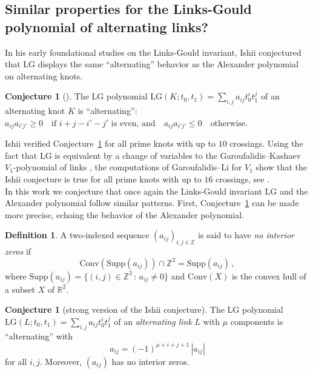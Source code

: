 \documentclass[12pt,reqno]{amsart}
\theoremstyle{definition}
\newtheorem{definition}[theorem]{Definition}
\newtheorem{conjecture}[theorem]{Conjecture}
\def\LG{\mathrm{LG}}
\begin{document}
\subsection{Similar properties for the Links-Gould polynomial of alternating links?} In his early foundational studies on the Links-Gould invariant, Ishii conjectured that $\LG$ displays the same ``alternating'' behavior as the Alexander polynomial on alternating knots.

\begin{conjecture}[\cite{Ishii}]\label{conj.0}
    The LG polynomial $\LG(K ; t_0, t_1) = \sum_{i,j} a_{ij} t_0^i t_1^j$ of an alternating knot $K$ is ``alternating'': 
$a_{ij} a_{i'j'} \geq 0 \quad \text{if } i + j - i' - j' \text{ is even, and} \quad
a_{ij} a_{i'j'} \leq 0 \quad \text{otherwise}$.
\end{conjecture}
Ishii verified Conjecture~\ref{conj.0} for all prime knots with up to $10$ crossings. Using the fact that $\LG$ is equivalent by a change of variables to the Garoufalidis--Kashaev $V_1$-polynomial of links \cite{GK:multi,GHKST,GHKKST}, the computations of Garoufalidis--Li for $V_1$ show that the Ishii conjecture is true for all prime knots with up to $16$ crossings, see \cite{GL:patterns}. \\


In this work we conjecture that once again the Links-Gould invariant $\LG$ and the Alexander polynomial follow similar patterns. First, Conjecture~\ref{conj.0} can be made more precise, echoing the behavior of the Alexander polynomial.

\begin{definition}
    A two-indexed sequence $(a_{ij})_{i,j \in \mathbb{Z}}$ is said to have \emph{no interior zeros} if 
    $$
    \text{Conv}(\text{Supp}(a_{ij})) \cap \mathbb{Z}^2 = \text{Supp}(a_{ij}) \,,
    $$
    where $
    \text{Supp}(a_{ij}) = \{ (i,j) \in \mathbb{Z}^2 \, : \, a_{ij} \neq 0   \} 
    $ and $\text{Conv}(X)$ is the convex hull of a subset $X$ of $\mathbb{R}^2$.
\end{definition}


\begin{conjecture}[strong version of the Ishii conjecture]\label{conj.1}
    The LG polynomial $\LG(L ; t_0, t_1) = \sum_{i,j} a_{ij} t_0^i t_1^j$ of an \emph{alternating link} $L$ with $\mu$ components is ``alternating'' with 
    $$a_{ij} = (-1)^{\mu + i + j + 1} \, |a_{ij}|  $$
    for all $i,j$. Moreover, $(a_{ij})$ has no interior zeros.
\end{conjecture}
\end{document}
